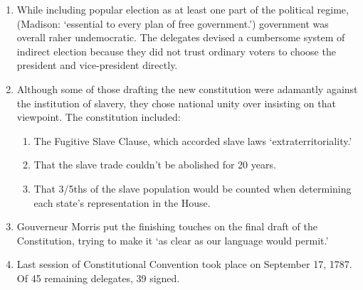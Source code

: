 \documentclass{article}
\begin{document}
\begin{enumerate}
\begin{enumerate}
      \end{enumerate}
      \item While including popular election as at least one part of the political regime, (Madison: `essential to every plan of free government.') government was overall raher undemocratic. The delegates devised a cumbersome system of indirect election because they did not trust ordinary voters to choose the president and vice-president directly.
      \item Although some of those drafting the new constitution were adamantly against the institution of slavery, they chose national unity over insisting on that viewpoint. The constitution included:
        \begin{enumerate}
          \item The Fugitive Slave Clause, which accorded slave laws `extraterritoriality.'
          \item That the slave trade couldn't be abolished for 20 years.
          \item That 3/5ths of the slave population would be counted when determining each state's representation in the House.
        \end{enumerate}
      \item Gouverneur Morris put the finishing touches on the final draft of the Constitution, trying to make it `as clear as our language would permit.'
      \item Last session of Constitutional Convention took place on September 17, 1787. Of 45 remaining delegates, 39 signed.
    \end{enumerate}
\end{document}
